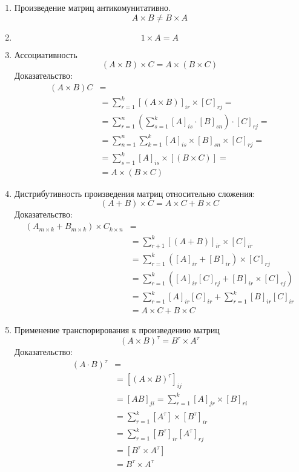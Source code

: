 \begin{enumerate}
  \item Произведение матриц антикомунитативно. \[
  A \times B \neq  B \times A
  \] 
  \item \[
  1 \times A = A
  \] 

  \item Ассоциативность \[
      (A \times B) \times C = A \times (B \times C)
  \]
  Доказательство:
  \begin{align*}
    \left( A \times  B \right) C &= \\
    &= \sum_{r=1}^{k} [(A \times B)]_{ir} \times [C]_{rj} = \\
    &= \sum_{r=1}^{n} \left( \sum_{s=1}^{k} [A]_{is} \cdot [B]_{sn} \right) \cdot [C]_{rj} = \\
    &= \sum_{n=1}^{n} \sum_{k=1}^{k} [A]_{is} \times [B]_{sn} \times [C]_{rj} = \\
    &= \sum_{s=1}^{k} [A]_{is} \times [\left( B \times C \right) ] =\\
    &= A \times (B \times C)
  \end{align*}

  \item Дистрибутивность произведения матриц относительно сложения: \[
      (A + B) \times C = A \times C + B \times C
  \] 
  Доказательство:
  \begin{align*}
    \left(A_{m \times k} + B_{m \times k}\right) \times C_{k \times n} &= \\
    &= \sum_{r+1}^{k} [\left( A + B \right) ]_{ir} \times [C]_{ir} \\
    &= \sum_{r=1}^{k} \left( [A]_{ir} + [B]_{ir} \right) \times [C]_{rj} \\
    &= \sum_{r=1}^{k} \left( [A]_{ir} [C]_{rj} + [B]_{ir} \times [C]_{rj} \right) \\
    &= \sum_{r=1}^{k} [A]_{ir} [C]_{ir} + \sum_{r=1}^{k} [B]_{ir} [C]_{ir} \\
    &= A \times C + B \times C
  \end{align*}

\item Применение транспорирования к произведению матриц \[
      (A \times B)^\tau = B^\tau \times A^\tau
  \]  
  Доказательство:
  \begin{align*}
    \left( A \cdot B \right)^\tau &= \\
    &= [ \left( A \times B \right)^\tau ]_{ij} \\
    &= [A B]_{ji} = \sum_{r=1}^{k} [A]_{jr} \times [B]_{ri} \\
    &= \sum_{r=1}^{k} [A^\tau] \times [B^\tau]_{ir} \\
    &= \sum_{r=1}^{k} [B^\tau]_{ir} [A^\tau]_{rj} \\
    &= [B^\tau \times A^\tau] \\
    &=B^\tau \times A^\tau
  \end{align*}
\end{enumerate}

